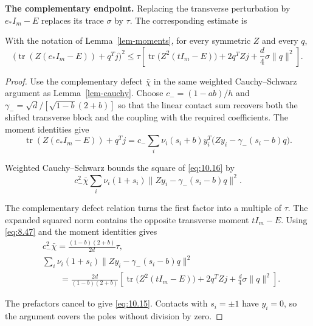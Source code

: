 \textbf{The complementary endpoint.} Replacing the transverse perturbation by
$e_*I_m-E$ replaces its trace $\sigma$ by $\tau$. The corresponding estimate is

\begin{lemma}\label{lem-cauchy-minus}
With the notation of Lemma~\ref{lem-moments}, for every symmetric $Z$ and every $q$,
\begin{equation}\label{eq:10.15}
\bigl(\operatorname{tr}(Z(e_*I_m-E))+q^Tj\bigr)^2
\le\tau\left[\operatorname{tr}\bigl(Z^2(tI_m-E)\bigr)
+2q^TZj+\frac d4\sigma\|q\|^2\right].
\end{equation}

\end{lemma}

\begin{proof}
Use the complementary defect $\bar\chi$ in the same weighted
Cauchy--Schwarz argument as Lemma~\ref{lem-cauchy}. Choose
$c_-=(1-ab)/h$ and $\gamma_-=\sqrt d/[\sqrt{1-b}(2+b)]$ so that the
linear contact sum recovers both the shifted transverse block and the
coupling with the required coefficients. The moment identities give
\begin{equation}\label{eq:10.16}
\operatorname{tr}(Z(e_*I_m-E))+q^Tj
=c_-\sum_i\nu_i(s_i+b)y_i^T\bigl(Zy_i-\gamma_-(s_i-b)q\bigr).
\end{equation}

Weighted Cauchy--Schwarz bounds the square of \eqref{eq:10.16} by
\begin{equation}\label{eq:10.17}
c_-^2\bar\chi\sum_i\nu_i(1+s_i)
\|Zy_i-\gamma_-(s_i-b)q\|^2.
\end{equation}

The complementary defect relation turns the first factor into a multiple of
$\tau$. The expanded squared norm contains the opposite transverse moment
$tI_m-E$. Using \eqref{eq:8.47} and the moment identities gives
\begin{equation}\label{eq:10.18}
\begin{aligned}
&c_-^2\bar\chi=\frac{(1-b)(2+b)}{2d}\tau,\\
&\sum_i\nu_i(1+s_i)\|Zy_i-\gamma_-(s_i-b)q\|^2\\
&\qquad=\frac{2d}{(1-b)(2+b)}\left[
\operatorname{tr}\bigl(Z^2(tI_m-E)\bigr)
+2q^TZj+\frac d4\sigma\|q\|^2\right].
\end{aligned}
\end{equation}

The prefactors cancel to give \eqref{eq:10.15}. Contacts with $s_i=\pm1$ have $y_i=0$, so the argument covers the poles without division by zero. 
\end{proof}

